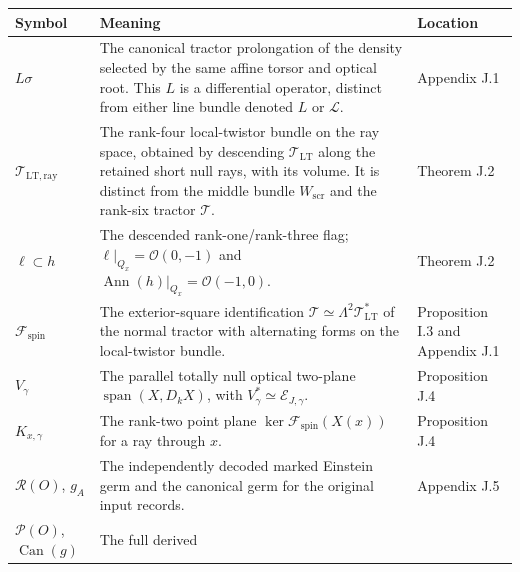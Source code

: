 \documentclass[
  english,
  11pt,
  reqno]{amsart}
\newcounter{none} %
\begin{document}
{\def\LTcaptype{none} %
\begin{longtable}[]{@{}
  >{\raggedright\arraybackslash}p{}
  >{\raggedright\arraybackslash}p{}
  >{\raggedright\arraybackslash}p{}@{}}
\toprule\noalign{}
\begin{minipage}[b]{\linewidth}\raggedright
Symbol
\end{minipage} & \begin{minipage}[b]{\linewidth}\raggedright
Meaning
\end{minipage} & \begin{minipage}[b]{\linewidth}\raggedright
Location
\end{minipage} \\
\midrule\noalign{}
\endhead
\bottomrule\noalign{}
\endlastfoot
\(L\sigma\) & The canonical tractor prolongation of the density selected
by the same affine torsor and optical root. This \(L\) is a differential
operator, distinct from either line bundle denoted \(L\) or
\(\mathcal L\). & Appendix J.1 \\
\(\mathcal T_{\mathrm{LT,ray}}\) & The rank-four local-twistor bundle on
the ray space, obtained by descending \(\mathcal T_{\mathrm{LT}}\) along
the retained short null rays, with its volume. It is distinct from the
middle bundle \(W_{\mathrm{scr}}\) and the rank-six tractor
\(\mathcal T\). & Theorem J.2 \\
\(\ell\subset h\) & The descended rank-one/rank-three flag;
\(\ell|_{Q_x}=\mathcal O(0,-1)\) and
\(\operatorname{Ann}(h)|_{Q_x}=\mathcal O(-1,0)\). & Theorem J.2 \\
\(\mathcal F_{\mathrm{spin}}\) & The exterior-square identification
\(\mathcal T\simeq\Lambda^2\mathcal T_{\mathrm{LT}}^*\) of the normal
tractor with alternating forms on the local-twistor bundle. &
Proposition I.3 and Appendix J.1 \\
\(V_\gamma\) & The parallel totally null optical two-plane
\(\operatorname{span}(X,D_kX)\), with
\(V_\gamma^*\simeq\mathcal E_{J,\gamma}\). & Proposition J.4 \\
\(K_{x,\gamma}\) & The rank-two point plane
\(\ker\mathcal F_{\mathrm{spin}}(X(x))\) for a ray through \(x\). &
Proposition J.4 \\
\(\mathcal R(O)\), \(g_A\) & The independently decoded marked Einstein
germ and the canonical germ for the original input records. & Appendix
J.5 \\
\(\mathcal P(O)\), \(\operatorname{Can}(g)\) & The full derived

\end{longtable}}
\end{document}
